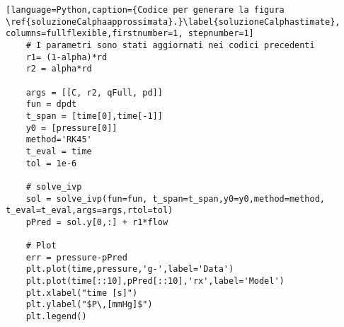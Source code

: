 \begin{lstlisting}[language=Python,caption={Codice per generare la figura \ref{soluzioneCalphaapprossimata}.}\label{soluzioneCalphastimate}, columns=fullflexible,firstnumber=1, stepnumber=1]
    # I parametri sono stati aggiornati nei codici precedenti
    r1= (1-alpha)*rd
    r2 = alpha*rd
    
    args = [[C, r2, qFull, pd]]
    fun = dpdt
    t_span = [time[0],time[-1]]
    y0 = [pressure[0]]
    method='RK45'
    t_eval = time
    tol = 1e-6
    
    # solve_ivp
    sol = solve_ivp(fun=fun, t_span=t_span,y0=y0,method=method, t_eval=t_eval,args=args,rtol=tol)
    pPred = sol.y[0,:] + r1*flow
    
    # Plot
    err = pressure-pPred
    plt.plot(time,pressure,'g-',label='Data')
    plt.plot(time[::10],pPred[::10],'rx',label='Model')
    plt.xlabel("time [s]")
    plt.ylabel("$P\,[mmHg]$")
    plt.legend()
\end{lstlisting}